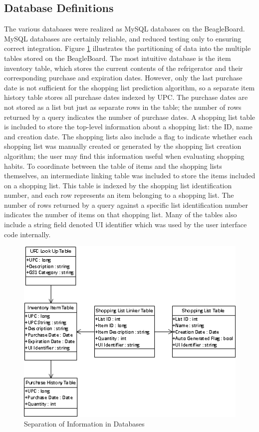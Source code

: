 \documentclass[11pt]{article} %
\begin{document}
\subsection{Database Definitions}
The various databases were realized as MySQL databases on the BeagleBoard. MySQL databases are certainly reliable, and reduced testing only to ensuring correct integration. Figure \ref{fig:databases} illustrates the partitioning of data into the multiple tables stored on the BeagleBoard. The most intuitive database is the item inventory table, which stores the current contents of the refrigerator and their corresponding purchase and expiration dates. However, only the last purchase date is not sufficient for the shopping list prediction algorithm, so a separate item history table stores all purchase dates indexed by UPC. The purchase dates are not stored as a list but just as separate rows in the table; the number of rows returned by a query indicates the number of purchase dates. A shopping list table is included to store the top-level information about a shopping list: the ID, name and creation date. The shopping lists also include a flag to indicate whether each shopping list was manually created or generated by the shopping list creation algorithm; the user may find this information useful when evaluating shopping habits. To coordinate between the table of items and the shopping lists themselves, an intermediate linking table was included to store the items included on a shopping list. This table is indexed by the shopping list identification number, and each row represents an item belonging to a shopping list. The number of rows returned by a query against a specific list identification number indicates the number of items on that shopping list. Many of the tables also include a string field denoted UI identifier which was used by the user interface code internally.
\begin{figure}[h!]
\vspace{0.5cm}
\begin{center}
\includegraphics[scale=0.7]{../Graphics/Databases}
\caption{Separation of Information in Databases}
\label{fig:databases}
\end{center}
\end{figure}
\end{document}

